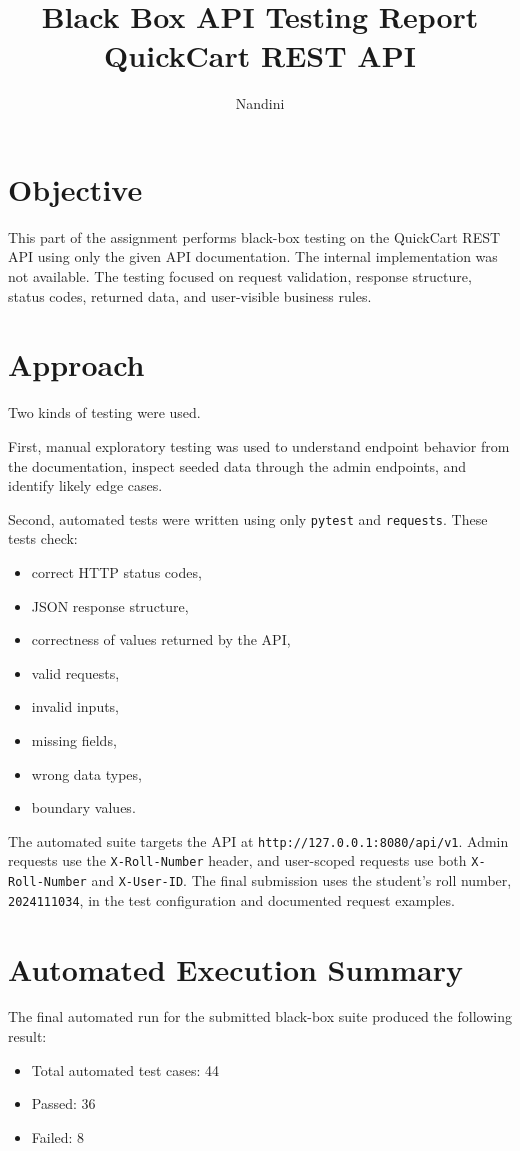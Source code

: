\documentclass[12pt]{article}
\title{Black Box API Testing Report\\QuickCart REST API}
\author{Nandini}
\date{}
\begin{document}
\maketitle

\section{Objective}
This part of the assignment performs black-box testing on the QuickCart REST API using only the given API documentation. The internal implementation was not available. The testing focused on request validation, response structure, status codes, returned data, and user-visible business rules.

\section{Approach}
Two kinds of testing were used.

First, manual exploratory testing was used to understand endpoint behavior from the documentation, inspect seeded data through the admin endpoints, and identify likely edge cases.

Second, automated tests were written using only \texttt{pytest} and \texttt{requests}. These tests check:
\begin{itemize}
    \item correct HTTP status codes,
    \item JSON response structure,
    \item correctness of values returned by the API,
    \item valid requests,
    \item invalid inputs,
    \item missing fields,
    \item wrong data types,
    \item boundary values.
\end{itemize}

The automated suite targets the API at \texttt{http://127.0.0.1:8080/api/v1}. Admin requests use the \texttt{X-Roll-Number} header, and user-scoped requests use both \texttt{X-Roll-Number} and \texttt{X-User-ID}. The final submission uses the student's roll number, \texttt{2024111034}, in the test configuration and documented request examples.

\section{Automated Execution Summary}
The final automated run for the submitted black-box suite produced the following result:
\begin{itemize}
    \item Total automated test cases: 44
    \item Passed: 36
    \item Failed: 8
\end{itemize}
\end{document}

